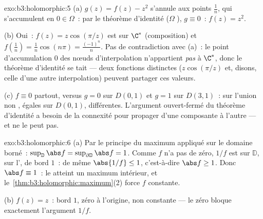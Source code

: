 \begin{solution}{exo:b3:holomorphic:5}
(a) $g(z) = f(z) - z^2$ s'annule aux points $\frac1n$, qui
s'accumulent en $0 \in \Omega$~: par le théorème d'identité
($\Omega$ ), $g \equiv 0$~: $f(z) = z^2$.

(b) Oui~: $f(z) = z\cos(\pi/z)$ est  sur $\C^*$
(composition) et $f(\frac1n) = \frac1n\cos(n\pi) =
\frac{(-1)^n}n$. Pas de contradiction avec (a)~: le point
d'accumulation $0$ des nœuds d'interpolation n'appartient
\emph{pas} à $\C^*$, donc le théorème d'identité se tait ---
deux fonctions distinctes ($z\cos(\pi/z)$ et, disons, celle
d'une autre interpolation) peuvent partager ces valeurs.

(c) $f \equiv 0$ partout, versus $g = 0$ sur $D(0,1)$ et $g =
1$ sur $D(3,1)$~:  sur l'union non , égales
sur $D(0,1)$, différentes. L'argument ouvert-fermé du
théorème d'identité a besoin de la connexité pour propager
d'une composante à l'autre --- et ne le peut pas.
\end{solution}

\begin{solution}{exo:b3:holomorphic:6}
(a) Par le principe du maximum appliqué sur le domaine
borné~: $\sup_{\mathbb D}\abs f = \sup_{\partial\mathbb
D}\abs f = 1$. Comme $f$ n'a pas de zéro, $1/f$ est
 sur $\mathbb D$,  sur l', de
 bord $1$~: de même $\abs{1/f} \leq 1$, c'est-à-dire
$\abs f \geq 1$. Donc $\abs f \equiv 1$~: le  atteint
un maximum intérieur, et le~\cref{thm:b3:holomorphic:maximum}(2)
force $f$ constante.

(b) $f(z) = z$~:  bord $1$, zéro à l'origine,
non constante --- le zéro bloque exactement l'argument
$1/f$.
\end{solution}

